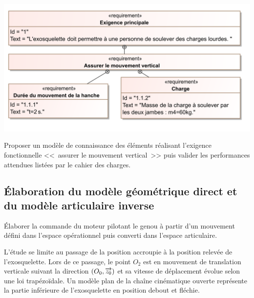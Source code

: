 \documentclass[10pt,fleqn]{article} %
\begin{document}
\begin{multicols}{2}
\begin{center}
\includegraphics[width=\linewidth]{images/Exigences}
\end{center}
\fi


\begin{obj}
Proposer un modèle de connaissance des éléments réalisant l’exigence fonctionnelle <<~assurer le mouvement vertical~>> puis valider les performances attendues listées par le cahier des charges.
\end{obj}



\subsection*{Élaboration du modèle géométrique direct et du modèle articulaire inverse}
\begin{obj}
Élaborer la commande du moteur pilotant le genou à partir d’un mouvement défini dans l’espace
opérationnel puis converti dans l’espace articulaire.
\end{obj}


L’étude se limite au passage de la position accroupie à la position relevée de l’exosquelette. Lors de ce passage,
le point $O_2$ est en mouvement de translation verticale suivant la direction $\left(O_0,\overrightarrow{{z_0}}\right)$ et sa vitesse de déplacement
évolue selon une loi trapézoïdale. Un modèle plan de la chaîne cinématique ouverte représente la partie inférieure
de l’exosquelette en position debout et fléchie.



\end{multicols}
\end{document}
